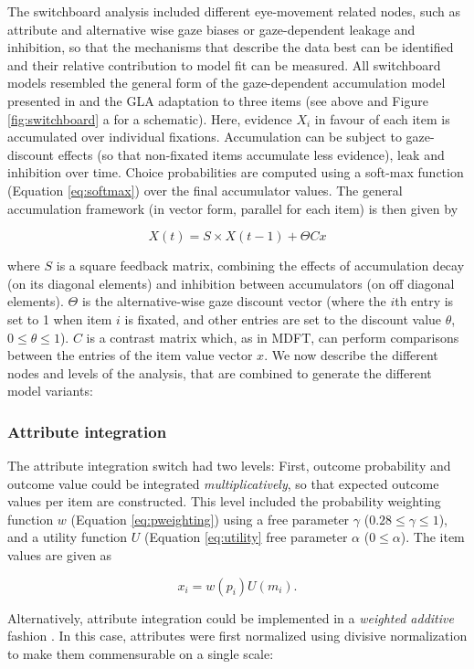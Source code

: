 \documentclass[11pt, a4paper]{article}
\begin{document}
The switchboard analysis included different eye-movement related nodes, such as attribute and alternative wise gaze biases or gaze-dependent leakage and inhibition, so that the mechanisms that describe the data best can be identified and their relative contribution to model fit can be measured. All switchboard models resembled the general form of the gaze-dependent accumulation model presented in \textcite{glickman2019FormationPreferenceRisky} and the GLA adaptation to three items (see above and Figure \ref{fig:switchboard} a for a schematic). Here, evidence $X_i$ in favour of each item is accumulated over individual fixations. Accumulation can be subject to gaze-discount effects (so that non-fixated items accumulate less evidence), leak and inhibition over time. Choice probabilities are computed using a soft-max function (Equation \ref{eq:softmax}) over the final accumulator values. The general accumulation framework (in vector form, parallel for each item) is then given by

$$X(t) = S \times X(t-1) + \Theta C x$$

where $S$ is a square feedback matrix, combining the effects of accumulation decay (on its diagonal elements) and inhibition between accumulators (on off diagonal elements). $\Theta$ is the alternative-wise gaze discount vector (where the $i$th entry is set to 1 when item $i$ is fixated, and other entries are set to the discount value $\theta$, $0 \le \theta \le 1$). $C$ is a contrast matrix which, as in MDFT, can perform comparisons between the entries of the item value vector $x$.
We now describe the different nodes and levels of the analysis, that are combined to generate the different model variants:

\subsubsection*{Attribute integration}
The attribute integration switch had two levels:
First, outcome probability and outcome value could be integrated \emph{multiplicatively}, so that expected outcome values per item are constructed. This level included the probability weighting function $w$ (Equation \ref{eq:pweighting}) using a free parameter $\gamma$ ($0.28 \le \gamma \le 1$), and a utility function $U$ (Equation \ref{eq:utility} free parameter $\alpha$ ($0 \le \alpha$).
The item values are given as

$$x_i = w(p_i) U(m_i).$$

Alternatively, attribute integration could be implemented in a \emph{weighted additive} fashion \parencite[]{rouault2019PrefrontalMechanismsCombining}. In this case, attributes were first normalized using divisive normalization \parencite{louie2013NormalizationGeneralNeural} to make them commensurable on a single scale:
\end{document}
